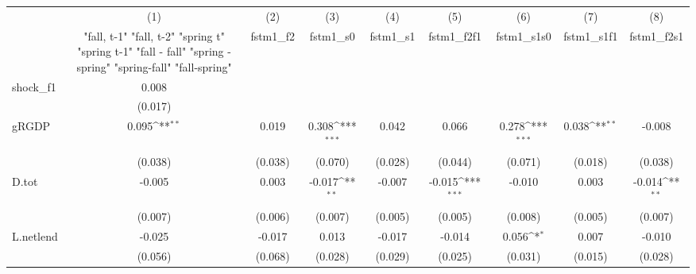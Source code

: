 {
\def\sym#1{\ifmmode^{#1}\else\(^{#1}\)\fi}
\begin{tabular}{l*{8}{c}}
\toprule
            &\multicolumn{1}{c}{(1)}&\multicolumn{1}{c}{(2)}&\multicolumn{1}{c}{(3)}&\multicolumn{1}{c}{(4)}&\multicolumn{1}{c}{(5)}&\multicolumn{1}{c}{(6)}&\multicolumn{1}{c}{(7)}&\multicolumn{1}{c}{(8)}\\
            &\multicolumn{1}{c}{  "fall, t-1" "fall, t-2" "spring t" "spring t-1"  "fall - fall" "spring - spring" "spring-fall" "fall-spring" }&\multicolumn{1}{c}{fstm1\_f2}&\multicolumn{1}{c}{fstm1\_s0}&\multicolumn{1}{c}{fstm1\_s1}&\multicolumn{1}{c}{fstm1\_f2f1}&\multicolumn{1}{c}{fstm1\_s1s0}&\multicolumn{1}{c}{fstm1\_s1f1}&\multicolumn{1}{c}{fstm1\_f2s1}\\
\midrule
shock\_f1    &       0.008         &                     &                     &                     &                     &                     &                     &                     \\
            &     (0.017)         &                     &                     &                     &                     &                     &                     &                     \\
\addlinespace
gRGDP       &       0.095\sym{**} &       0.019         &       0.308\sym{***}&       0.042         &       0.066         &       0.278\sym{***}&       0.038\sym{**} &      -0.008         \\
            &     (0.038)         &     (0.038)         &     (0.070)         &     (0.028)         &     (0.044)         &     (0.071)         &     (0.018)         &     (0.038)         \\
\addlinespace
D.tot       &      -0.005         &       0.003         &      -0.017\sym{**} &      -0.007         &      -0.015\sym{***}&      -0.010         &       0.003         &      -0.014\sym{**} \\
            &     (0.007)         &     (0.006)         &     (0.007)         &     (0.005)         &     (0.005)         &     (0.008)         &     (0.005)         &     (0.007)         \\
\addlinespace
L.netlend   &      -0.025         &      -0.017         &       0.013         &      -0.017         &      -0.014         &       0.056\sym{*}  &       0.007         &      -0.010         \\
            &     (0.056)         &     (0.068)         &     (0.028)         &     (0.029)         &     (0.025)         &     (0.031)         &     (0.015)         &     (0.028)         \\

\end{tabular}}
